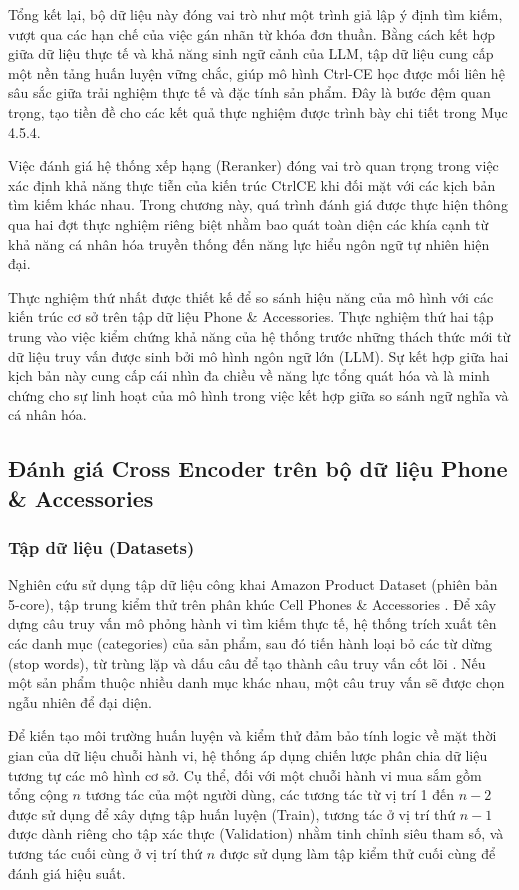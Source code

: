 Tổng kết lại, bộ dữ liệu này đóng vai trò như một trình giả lập ý định tìm kiếm, vượt qua các hạn chế của việc gán nhãn từ khóa đơn thuần. Bằng cách kết hợp giữa dữ liệu thực tế và khả năng sinh ngữ cảnh của LLM, tập dữ liệu cung cấp một nền tảng huấn luyện vững chắc, giúp mô hình Ctrl-CE học được mối liên hệ sâu sắc giữa trải nghiệm thực tế và đặc tính sản phẩm. Đây là bước đệm quan trọng, tạo tiền đề cho các kết quả thực nghiệm được trình bày chi tiết trong Mục 4.5.4.


Việc đánh giá hệ thống xếp hạng (Reranker) đóng vai trò quan trọng trong việc xác định khả năng thực tiễn của kiến trúc CtrlCE khi đối mặt với các kịch bản tìm kiếm khác nhau. Trong chương này, quá trình đánh giá được thực hiện thông qua hai đợt thực nghiệm riêng biệt nhằm bao quát toàn diện các khía cạnh từ khả năng cá nhân hóa truyền thống đến năng lực hiểu ngôn ngữ tự nhiên hiện đại. 

Thực nghiệm thứ nhất được thiết kế để so sánh hiệu năng của mô hình với các kiến trúc cơ sở trên tập dữ liệu Phone \& Accessories. Thực nghiệm thứ hai tập trung vào việc kiểm chứng khả năng của hệ thống trước những thách thức mới từ dữ liệu truy vấn được sinh bởi mô hình ngôn ngữ lớn (LLM). Sự kết hợp giữa hai kịch bản này cung cấp cái nhìn đa chiều về năng lực tổng quát hóa và là minh chứng cho sự linh hoạt của mô hình trong việc kết hợp giữa so sánh ngữ nghĩa và cá nhân hóa.

\subsection{Đánh giá Cross Encoder trên bộ dữ liệu Phone \& Accessories}

\subsubsection*{Tập dữ liệu (Datasets)}
Nghiên cứu sử dụng tập dữ liệu công khai Amazon Product Dataset (phiên bản 5-core), tập trung kiểm thử trên phân khúc Cell Phones \& Accessories \cite{23}. Để xây dựng câu truy vấn mô phỏng hành vi tìm kiếm thực tế, hệ thống trích xuất tên các danh mục (categories) của sản phẩm, sau đó tiến hành loại bỏ các từ dừng (stop words), từ trùng lặp và dấu câu để tạo thành câu truy vấn cốt lõi \cite{23}. Nếu một sản phẩm thuộc nhiều danh mục khác nhau, một câu truy vấn sẽ được chọn ngẫu nhiên để đại diện. 

Để kiến tạo môi trường huấn luyện và kiểm thử đảm bảo tính logic về mặt thời gian của dữ liệu chuỗi hành vi, hệ thống áp dụng chiến lược phân chia dữ liệu tương tự các mô hình cơ sở. Cụ thể, đối với một chuỗi hành vi mua sắm gồm tổng cộng $n$ tương tác của một người dùng, các tương tác từ vị trí 1 đến $n-2$ được sử dụng để xây dựng tập huấn luyện (Train), tương tác ở vị trí thứ $n-1$ được dành riêng cho tập xác thực (Validation) nhằm tinh chỉnh siêu tham số, và tương tác cuối cùng ở vị trí thứ $n$ được sử dụng làm tập kiểm thử cuối cùng để đánh giá hiệu suất.

